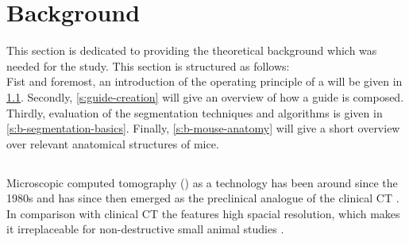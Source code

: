 

\chapter{Background}\label{c:background}
This section is dedicated to providing the theoretical background which was needed for the study. 
This section is structured as follows:\\
Fist and foremost, an introduction of the operating principle of a \mct\space will be given in \cref{s:b-microct}.
Secondly, \cref{s:guide-creation} will give an overview of how a guide is composed.
Thirdly, evaluation of the segmentation techniques and algorithms is given in \cref{s:b-segmentation-basics}.
Finally, \cref{s:b-mouse-anatomy} will give a short overview over relevant anatomical structures of mice.


\section{\mct}\label{s:b-microct}
Microscopic computed tomography (\mct) as a technology has been around since the 1980s and has since then emerged as the preclinical analogue of the clinical CT \cite{clarkAdvancesMicroCTImaging2021,ritmanCurrentStatusDevelopments2011}.
In comparison with clinical CT the \mct\space features high spacial resolution, which makes it irreplaceable for non-destructive small animal studies \cite{clarkAdvancesMicroCTImaging2021,ritmanCurrentStatusDevelopments2011,keklikoglouMicroCTBiologicalBiomedical2021}.


